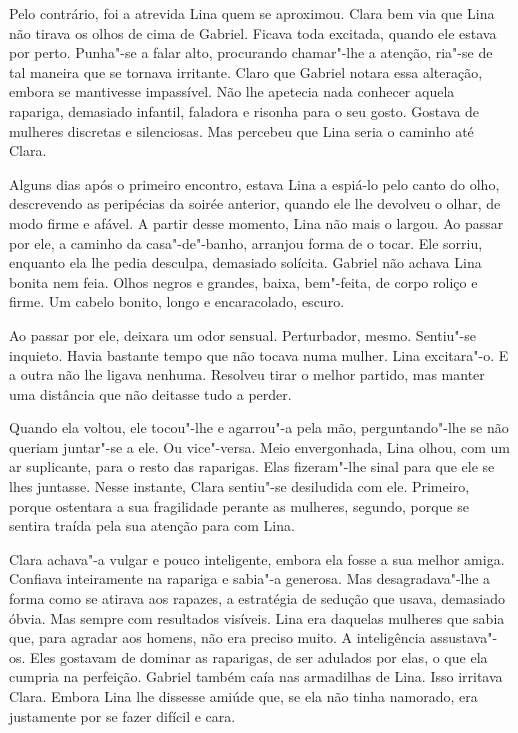 Pelo contrário, foi a atrevida Lina quem se aproximou. Clara bem via que
Lina não tirava os olhos de cima de Gabriel. Ficava toda excitada,
quando ele estava por perto. Punha"-se a falar alto, procurando
chamar"-lhe a atenção, ria"-se de tal maneira que se tornava irritante.
Claro que Gabriel notara essa alteração, embora se mantivesse
impassível. Não lhe apetecia nada conhecer aquela rapariga, demasiado
infantil, faladora e risonha para o seu gosto. Gostava de mulheres
discretas e silenciosas. Mas percebeu que Lina seria o caminho até
Clara.

Alguns dias após o primeiro encontro, estava Lina a espiá-lo pelo canto
do olho, descrevendo as peripécias da soirée anterior, quando ele lhe
devolveu o olhar, de modo firme e afável. A partir desse momento, Lina
não mais o largou. Ao passar por ele, a caminho da casa"-de"-banho,
arranjou forma de o tocar. Ele sorriu, enquanto ela lhe pedia desculpa,
demasiado solícita. Gabriel não achava Lina bonita nem feia. Olhos
negros e grandes, baixa, bem"-feita, de corpo roliço e firme. Um cabelo
bonito, longo e encaracolado, escuro.

Ao passar por ele, deixara um odor sensual. Perturbador, mesmo.
Sentiu"-se inquieto. Havia bastante tempo que não tocava numa mulher.
Lina excitara"-o. E a outra não lhe ligava nenhuma. Resolveu tirar o
melhor partido, mas manter uma distância que não deitasse tudo a perder.

Quando ela voltou, ele tocou"-lhe e agarrou"-a pela mão, perguntando"-lhe
se não queriam juntar"-se a ele. Ou vice"-versa. Meio envergonhada, Lina
olhou, com um ar suplicante, para o resto das raparigas. Elas
fizeram"-lhe sinal para que ele se lhes juntasse. Nesse instante, Clara
sentiu"-se desiludida com ele. Primeiro, porque ostentara a sua
fragilidade perante as mulheres, segundo, porque se sentira traída pela
sua atenção para com Lina.

Clara achava"-a vulgar e pouco inteligente, embora ela fosse a sua melhor
amiga. Confiava inteiramente na rapariga e sabia"-a generosa. Mas
desagradava"-lhe a forma como se atirava aos rapazes, a estratégia de
sedução que usava, demasiado óbvia. Mas sempre com resultados visíveis.
Lina era daquelas mulheres que sabia que, para agradar aos homens, não
era preciso muito. A inteligência assustava"-os. Eles gostavam de dominar
as raparigas, de ser adulados por elas, o que ela cumpria na perfeição.
Gabriel também caía nas armadilhas de Lina. Isso irritava Clara. Embora
Lina lhe dissesse amiúde que, se ela não tinha namorado, era justamente
por se fazer difícil e cara.

